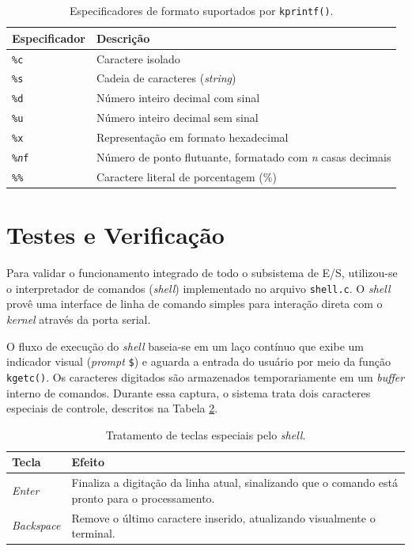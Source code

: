 \begin{table}[htbp]
    \centering
    \renewcommand{\arraystretch}{1.2}
    \begin{tabular}{@{}lp{9cm}@{}}
        \hline
        \textbf{Especificador} & \textbf{Descrição} \\
        \hline
        \texttt{\%c} & Caractere isolado \\
        \texttt{\%s} & Cadeia de caracteres (\textit{string}) \\
        \texttt{\%d} & Número inteiro decimal com sinal \\
        \texttt{\%u} & Número inteiro decimal sem sinal \\
        \texttt{\%x} & Representação em formato hexadecimal \\
        \texttt{\%\textit{n}f} & Número de ponto flutuante, formatado com \textit{n} casas decimais \\
        \texttt{\%\%} & Caractere literal de porcentagem (\%) \\
        \hline
    \end{tabular}
    \caption{Especificadores de formato suportados por \texttt{kprintf()}.}
    \label{tab:kprintf-especificadores}
\end{table}


\section{Testes e Verificação}

Para validar o funcionamento integrado de todo o subsistema de E/S, utilizou-se o interpretador de comandos (\textit{shell}) implementado no arquivo \texttt{shell.c}. O \textit{shell} provê uma interface de linha de comando simples para interação direta com o \textit{kernel} através da porta serial.

O fluxo de execução do \textit{shell} baseia-se em um laço contínuo que exibe um indicador visual (\textit{prompt} \texttt{\$}) e aguarda a entrada do usuário por meio da função \texttt{kgetc()}. Os caracteres digitados são armazenados temporariamente em um \textit{buffer} interno de comandos. Durante essa captura, o sistema trata dois caracteres especiais de controle, descritos na Tabela \ref{tab:shell-teclas}.

\begin{table}[htbp]
    \centering
    \renewcommand{\arraystretch}{1.2}
    \begin{tabular}{@{}lp{9cm}@{}}
        \hline
        \textbf{Tecla} & \textbf{Efeito} \\
        \hline
        \textit{Enter} & Finaliza a digitação da linha atual, sinalizando que o comando está pronto para o processamento. \\
        \textit{Backspace} & Remove o último caractere inserido, atualizando visualmente o terminal. \\
        \hline
    \end{tabular}
    \caption{Tratamento de teclas especiais pelo \textit{shell}.}
    \label{tab:shell-teclas}
\end{table}

